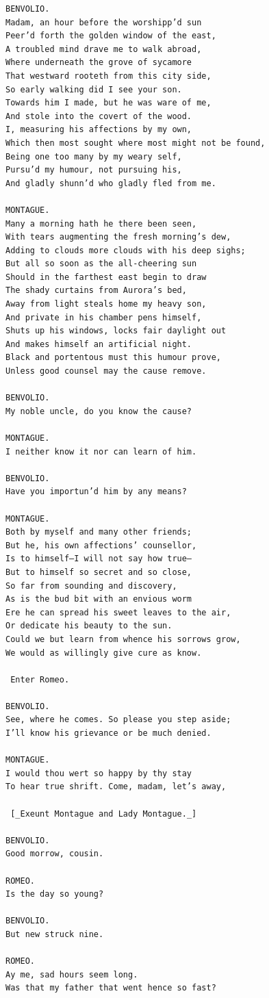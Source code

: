 \documentclass{article}
\begin{document}
\begin{verbatim}
BENVOLIO.
Madam, an hour before the worshipp’d sun
Peer’d forth the golden window of the east,
A troubled mind drave me to walk abroad,
Where underneath the grove of sycamore
That westward rooteth from this city side,
So early walking did I see your son.
Towards him I made, but he was ware of me,
And stole into the covert of the wood.
I, measuring his affections by my own,
Which then most sought where most might not be found,
Being one too many by my weary self,
Pursu’d my humour, not pursuing his,
And gladly shunn’d who gladly fled from me.

MONTAGUE.
Many a morning hath he there been seen,
With tears augmenting the fresh morning’s dew,
Adding to clouds more clouds with his deep sighs;
But all so soon as the all-cheering sun
Should in the farthest east begin to draw
The shady curtains from Aurora’s bed,
Away from light steals home my heavy son,
And private in his chamber pens himself,
Shuts up his windows, locks fair daylight out
And makes himself an artificial night.
Black and portentous must this humour prove,
Unless good counsel may the cause remove.

BENVOLIO.
My noble uncle, do you know the cause?

MONTAGUE.
I neither know it nor can learn of him.

BENVOLIO.
Have you importun’d him by any means?

MONTAGUE.
Both by myself and many other friends;
But he, his own affections’ counsellor,
Is to himself—I will not say how true—
But to himself so secret and so close,
So far from sounding and discovery,
As is the bud bit with an envious worm
Ere he can spread his sweet leaves to the air,
Or dedicate his beauty to the sun.
Could we but learn from whence his sorrows grow,
We would as willingly give cure as know.

 Enter Romeo.

BENVOLIO.
See, where he comes. So please you step aside;
I’ll know his grievance or be much denied.

MONTAGUE.
I would thou wert so happy by thy stay
To hear true shrift. Come, madam, let’s away,

 [_Exeunt Montague and Lady Montague._]

BENVOLIO.
Good morrow, cousin.

ROMEO.
Is the day so young?

BENVOLIO.
But new struck nine.

ROMEO.
Ay me, sad hours seem long.
Was that my father that went hence so fast?


\end{verbatim}
\end{document}
